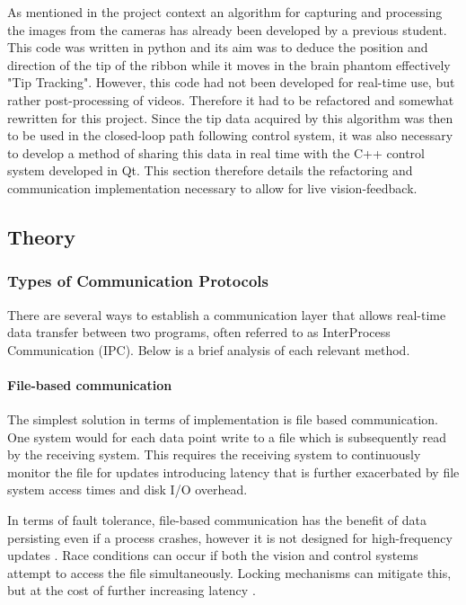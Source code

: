 As mentioned in the project context an algorithm for capturing and processing the images from the cameras has already been developed by a previous student. This code was written in python and its aim was to deduce the position and direction of the tip of the ribbon while it moves in the brain phantom effectively "Tip Tracking". However, this code had not been developed for real-time use, but rather post-processing of videos.  Therefore it had to be refactored and somewhat rewritten for this project. Since the tip data acquired by this algorithm was then to be used in the closed-loop path following control system, it was also necessary to develop a method of sharing this data in real time with the C++ control system developed in Qt. This section therefore details the refactoring and communication implementation necessary to allow for live vision-feedback.

\subsection{Theory}
\subsubsection{Types of Communication Protocols}
There are several ways to establish a communication layer that allows real-time data transfer between two programs, often referred to as InterProcess Communication (IPC). Below is a brief analysis of each relevant method.


\paragraph*{File-based communication}
The simplest solution in terms of implementation is file based communication. One system would for each data point write to a file which is subsequently read by the receiving system. This requires the receiving system to continuously monitor the file for updates introducing latency that is further exacerbated by file system access times and disk I/O overhead. 

In terms of fault tolerance, file-based communication has the benefit of data persisting even if a process crashes, however it is not designed for high-frequency updates \cite{gray_interprocess_2003}. Race conditions can occur if both the vision and control systems attempt to access the file simultaneously. Locking mechanisms can mitigate this, but at the cost of further increasing latency \cite{gray_interprocess_2003}. 

